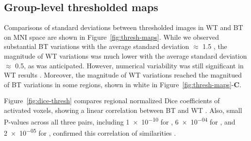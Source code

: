 \documentclass[conference]{IEEEtran}
\begin{document}
\subsection{Group-level thresholded maps}

Comparisons of standard deviations between thresholded images  in WT and BT
on MNI space are shown in Figure~\ref{fig:thresh-maps}.
While we observed substantial BT variations with the average standard deviation $\approx$ 1.5 ,
the magnitude of WT variations was much lower with the average standard deviation $\approx$ 0.5,
as was anticipated. However, numerical variability was still significant in WT results .
Moreover, the magnitude of WT variations reached the magnitued of BT variations
in some regions, shown in white in Figure~\ref{fig:thresh-maps}-\textbf{C}.

Figure~\ref{fig:dice-thresh} compares regional normalized Dice coefficients of
activated voxels, showing a linear correlation between BT and WT . 
Also, small P-values across all three pairs, including \num{1e-10} for \fslafni, \num{6e-04} for \fslspm,
and \num{2e-05} for \afnispm, confirmed this correlation of similarities .
\end{document}
